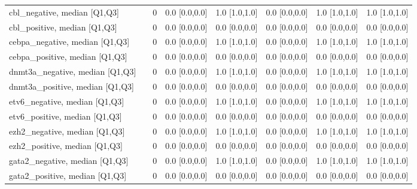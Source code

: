 \begin{tabular}{llllllll}
cbl\_negative, median [Q1,Q3] &    &                    0 &     0.0 [0.0,0.0] &           1.0 [1.0,1.0] &     0.0 [0.0,0.0] &             1.0 [1.0,1.0] &             1.0 [1.0,1.0] \\
cbl\_positive, median [Q1,Q3] &    &                    0 &     0.0 [0.0,0.0] &           0.0 [0.0,0.0] &     0.0 [0.0,0.0] &             0.0 [0.0,0.0] &             0.0 [0.0,0.0] \\
cebpa\_negative, median [Q1,Q3] &    &                    0 &     0.0 [0.0,0.0] &           1.0 [1.0,1.0] &     0.0 [0.0,0.0] &             1.0 [1.0,1.0] &             1.0 [1.0,1.0] \\
cebpa\_positive, median [Q1,Q3] &    &                    0 &     0.0 [0.0,0.0] &           0.0 [0.0,0.0] &     0.0 [0.0,0.0] &             0.0 [0.0,0.0] &             0.0 [0.0,0.0] \\
dnmt3a\_negative, median [Q1,Q3] &    &                    0 &     0.0 [0.0,0.0] &           1.0 [1.0,1.0] &     0.0 [0.0,0.0] &             1.0 [1.0,1.0] &             1.0 [1.0,1.0] \\
dnmt3a\_positive, median [Q1,Q3] &    &                    0 &     0.0 [0.0,0.0] &           0.0 [0.0,0.0] &     0.0 [0.0,0.0] &             0.0 [0.0,0.0] &             0.0 [0.0,0.0] \\
etv6\_negative, median [Q1,Q3] &    &                    0 &     0.0 [0.0,0.0] &           1.0 [1.0,1.0] &     0.0 [0.0,0.0] &             1.0 [1.0,1.0] &             1.0 [1.0,1.0] \\
etv6\_positive, median [Q1,Q3] &    &                    0 &     0.0 [0.0,0.0] &           0.0 [0.0,0.0] &     0.0 [0.0,0.0] &             0.0 [0.0,0.0] &             0.0 [0.0,0.0] \\
ezh2\_negative, median [Q1,Q3] &    &                    0 &     0.0 [0.0,0.0] &           1.0 [1.0,1.0] &     0.0 [0.0,0.0] &             1.0 [1.0,1.0] &             1.0 [1.0,1.0] \\
ezh2\_positive, median [Q1,Q3] &    &                    0 &     0.0 [0.0,0.0] &           0.0 [0.0,0.0] &     0.0 [0.0,0.0] &             0.0 [0.0,0.0] &             0.0 [0.0,0.0] \\
gata2\_negative, median [Q1,Q3] &    &                    0 &     0.0 [0.0,0.0] &           1.0 [1.0,1.0] &     0.0 [0.0,0.0] &             1.0 [1.0,1.0] &             1.0 [1.0,1.0] \\
gata2\_positive, median [Q1,Q3] &    &                    0 &     0.0 [0.0,0.0] &           0.0 [0.0,0.0] &     0.0 [0.0,0.0] &             0.0 [0.0,0.0] &             0.0 [0.0,0.0] \\

\end{tabular}
